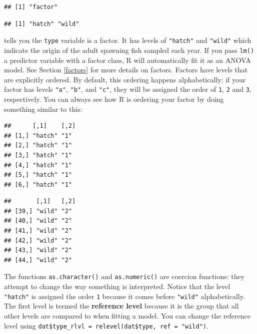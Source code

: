 \documentclass[]{book}
\newenvironment{Shaded}{\begin{snugshade}}{\end{snugshade}}
\newcommand{\KeywordTok}[1]{\textcolor[rgb]{0.13,0.29,0.53}{\textbf{#1}}}
\newcommand{\NormalTok}[1]{#1}
\newcommand{\OperatorTok}[1]{\textcolor[rgb]{0.81,0.36,0.00}{\textbf{#1}}}
\newcommand{\StringTok}[1]{\textcolor[rgb]{0.31,0.60,0.02}{#1}}
\begin{document}
\begin{verbatim}
## [1] "factor"
\end{verbatim}

\begin{verbatim}
## [1] "hatch" "wild"
\end{verbatim}

tells you the \texttt{type} variable is a factor. It has levels of \texttt{"hatch"} and \texttt{"wild"} which indicate the origin of the adult spawning fish sampled each year. If you pass \texttt{lm()} a predictor variable with a factor class, R will automatically fit it as an ANOVA model. See Section \ref{factors} for more details on factors. Factors have levels that are explicitly ordered. By default, this ordering happens alphabetically: if your factor has levels \texttt{"a"}, \texttt{"b"}, and \texttt{"c"}, they will be assigned the order of \texttt{1}, \texttt{2} and \texttt{3}, respectively. You can always see how R is ordering your factor by doing something similar to this:

\begin{Shaded}
\end{Shaded}

\begin{verbatim}
##      [,1]    [,2]
## [1,] "hatch" "1" 
## [2,] "hatch" "1" 
## [3,] "hatch" "1" 
## [4,] "hatch" "1" 
## [5,] "hatch" "1" 
## [6,] "hatch" "1"
\end{verbatim}

\begin{verbatim}
##       [,1]   [,2]
## [39,] "wild" "2" 
## [40,] "wild" "2" 
## [41,] "wild" "2" 
## [42,] "wild" "2" 
## [43,] "wild" "2" 
## [44,] "wild" "2"
\end{verbatim}

The functions \texttt{as.character()} and \texttt{as.numeric()} are coercion functions: they attempt to change the way something is interpreted. Notice that the level \texttt{"hatch"} is assigned the order \texttt{1} because it comes before \texttt{"wild"} alphabetically. The first level is termed the \textbf{reference level} because it is the group that all other levels are compared to when fitting a model. You can change the reference level using \texttt{dat\$type\_rlvl\ =\ relevel(dat\$type,\ ref\ =\ "wild")}.
\end{document}
